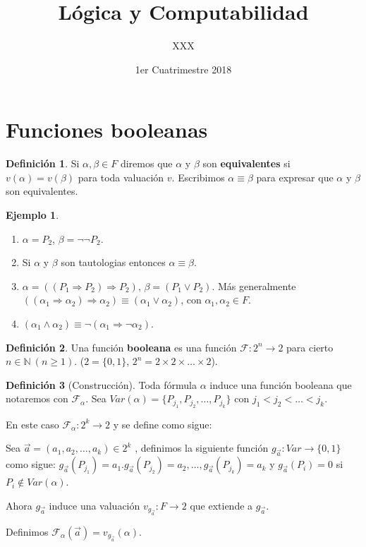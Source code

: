 \documentclass[a4paper,11pt]{article}
\title{Lógica y Computabilidad}
\author{XXX}
\date{1er Cuatrimestre 2018}
\theoremstyle{definition}
\newtheorem{defn}{Definición}[section]
\newtheorem{exap}{Ejemplo}[section]
\theoremstyle{remark}
\def\FF{\mathcal{F}}
\def\NN{\mathbb{N}}
\def\FFa{\mathcal{F}_{\alpha}}
\begin{document}
\maketitle

\section{Funciones booleanas}

\begin{defn}
Si $\alpha, \beta \in F$ diremos que $\alpha$ y $\beta$ son \textbf{equivalentes} si
$v(\alpha) = v(\beta)$ para toda valuación $v$. Escribimos $\alpha \equiv \beta$ para
expresar que $\alpha$ y $\beta$ son equivalentes.
\end{defn}

\begin{exap}
\begin{enumerate}
\item $\alpha = P_2$, $\beta = \neg \neg P_2$.
\item Si $\alpha$ y $\beta$ son tautologias entonces $\alpha \equiv \beta$.
\item $\alpha =  ((P_1 \Rightarrow P_2) \Rightarrow P_2)$, $\beta = (P_1 \vee P_2)$. 
Más generalmente $((\alpha_1 \Rightarrow \alpha_2) \Rightarrow \alpha_2) 
\equiv (\alpha_1 \vee \alpha_2)$, con $\alpha_1, \alpha_2 \in F$.
\item $(\alpha_1 \wedge \alpha_2) \equiv \neg (\alpha_1 \Rightarrow \neg \alpha_2)$.
\end{enumerate}
\end{exap}

\begin{defn}
Una función \textbf{booleana} es una función $\FF : 2^n \to 2$ para cierto $n \in \NN\ (n \ge 1)$.
($2 = \{0, 1\}$, $2^n = 2 \times 2 \times \dots \times 2$).
\end{defn}

\begin{defn}[Construcción]
Toda fórmula $\alpha$ induce una función booleana que notaremos con $\FFa$.
Sea $Var(\alpha) = \{P_{j_1}, P_{j_2}, \dots, P_{j_k}\}$ con $j_1 < j_2 < \dots < j_k$.

En este caso $\FFa : 2^k \to 2$ y se define como sigue:

Sea $\vec{a} = (a_1, a_2, \dots, a_k) \in 2^k$ , definimos la siguiente función
$g_{\vec{a}} : Var \to \{0, 1\}$ como sigue: $g_{\vec{a}}(P_{j_1}) = a_1. 
g_{\vec{a}}(P_{j_2}) = a_2, \dots, g_{\vec{a}}(P_{j_k}) = a_k$ y $g_{\vec{a}}(P_i) = 0$
si $P_i \not\in Var(\alpha)$.

Ahora $g_{\vec{a}}$ induce una valuación $v_{g_{\vec{a}}} : F \to 2$ que extiende a $g_{\vec{a}}$.

Definimos $\FFa(\vec{a}) = v_{g_{\vec{a}}}(\alpha)$.
\end{defn}
\end{document}
